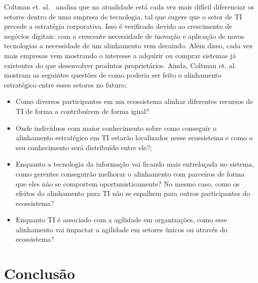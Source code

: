 \documentclass[review]{elsarticle}
\begin{document}
Coltman et. al.~\cite{Coltman15} analisa que na atualidade está cada vez mais difícil diferenciar os setores dentro de uma empresa de tecnologia, tal que sugere que o setor de TI precede a estratégia corporativa. Isso é verificado devido ao crescimento de negócios digitais: com a crescente necessidade de inovação e aplicação de novas tecnologias a necessidade de um alinhamento vem decaindo. Além disso, cada vez mais empresas vem mostrando o interesse a adquirir ou comprar sistemas já existentes do que desenvolver produtos proprietários. Ainda, Coltman et. al. mostram as seguintes questões de como poderia ser feito o alinhamento estratégico entre esses setores no futuro: 

\begin{itemize}
	\item Como diversos participantes em um ecossistema alinhar diferentes recursos de TI de forma a contribuírem de forma igual?
	\item Onde indivíduos com maior conhecimento sobre como conseguir o alinhamento estratégico em TI estarão localizados nesse ecossistema e como o seu conhecimento será distribuído entre ele?;
	\item Enquanto a tecnologia da informação vai ficando mais entrelaçada no sistema, como gerentes conseguirão melhorar o alinhamento com parceiros de forma que eles não se comportem oportunisticamente? No mesmo caso, como os efeitos do alinhamento para TI não se espalhem para outros participantes do ecossistema?
	\item Enquanto TI é associado com a agilidade em organizações, como esse alinhamento vai impactar a agilidade em setores únicos ou através do ecossistema?
\end{itemize}

\section{Conclusão}




\end{document}

